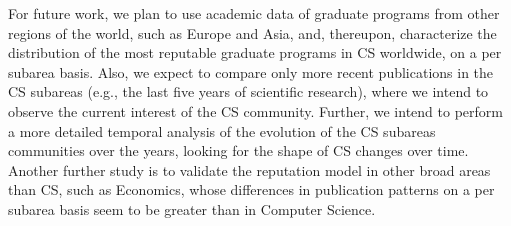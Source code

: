 \documentclass[msc]{ppgccufmg}
\begin{document}

%

For future work, we plan to use academic data of graduate programs from other regions of the world, such as Europe and Asia, and, thereupon, characterize the distribution of the most reputable graduate programs in CS worldwide, on a per subarea basis. Also, we expect to compare only more recent publications in the CS subareas (e.g., the last five years of scientific research), where we intend to observe the current interest of the CS community. Further, we intend to perform a more detailed temporal analysis of the evolution of the CS subareas communities over the years, looking for the shape of CS changes over time. Another further study is to validate the reputation model in other broad areas than CS, such as Economics, whose differences in publication patterns on a per subarea basis seem to be greater than in Computer Science.

\end{document}
